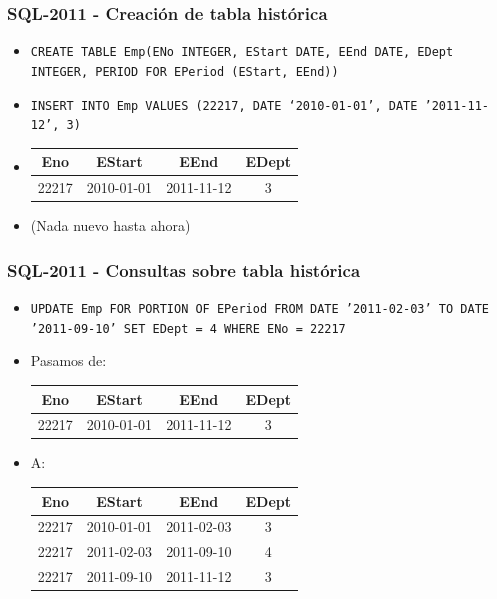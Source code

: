 \begin{frame}
\frametitle{SQL-2011 - Creación de tabla histórica}
\begin{center}
\small
	\begin{itemize}

	\item	\texttt{CREATE TABLE Emp(ENo INTEGER, EStart DATE, EEnd DATE,
		EDept INTEGER, PERIOD FOR EPeriod (EStart, EEnd))} \\
	\pause

	\item	\texttt{INSERT INTO Emp VALUES (22217, DATE ‘2010-01-01’,
		DATE '2011-11-12', 3)} \\

	\pause

	\item \begin{tabular}{|c|c|c|c|}
	\hline
	Eno	& EStart	& EEnd		& EDept	\\ \hline
	22217	& 2010-01-01	& 2011-11-12	& 3	\\ \hline
	\end{tabular}

	\pause

	\item	(Nada nuevo hasta ahora)
	\end{itemize}
\end{center}
\end{frame}

\begin{frame}
\frametitle{SQL-2011 - Consultas sobre tabla histórica}
\begin{center}
\small
	\begin{itemize}

	\item	\texttt{UPDATE Emp FOR PORTION OF EPeriod FROM DATE '2011-02-03'
		TO DATE '2011-09-10' SET EDept = 4 WHERE ENo = 22217}
	\pause

	\item Pasamos de: \hfill \begin{tabular}{|c|c|c|c|}
	\hline
	Eno	& EStart	& EEnd		& EDept	\\ \hline
	22217	& 2010-01-01	& 2011-11-12	& 3	\\ \hline
	\end{tabular}
	\pause

	\item A: \hfill \begin{tabular}{|c|c|c|c|}
	\hline
	Eno	& EStart	& EEnd		& EDept	\\ \hline
	22217	& 2010-01-01	& 2011-02-03	& 3	\\ \hline
	22217	& 2011-02-03	& 2011-09-10	& 4	\\ \hline
	22217	& 2011-09-10	& 2011-11-12	& 3	\\ \hline
	\end{tabular}

	\end{itemize}
\end{center}
\end{frame}
